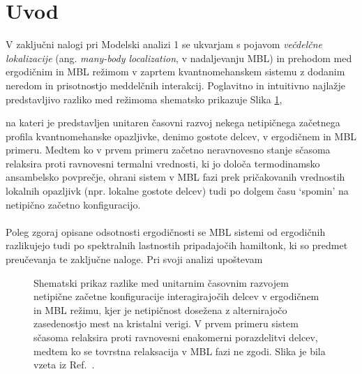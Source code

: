 \documentclass[10pt,a4paper]{article}
\begin{document}
\section{Uvod}
V zaključni nalogi pri Modelski analizi 1 se ukvarjam s pojavom \emph{večdelčne lokalizacije} (ang. \emph{many-body localization}, v nadaljevanju MBL) in prehodom med ergodičnim in MBL režimom v zaprtem kvantnomehanskem sistemu z dodanim neredom in prisotnostjo meddelčnih interakcij. Poglavitno in intuitivno najlažje predstavljivo razliko med režimoma shematsko prikazuje Slika \ref{fig:abanin_thermalization},
\noindent 
\begin{minipage}[t]{0.45\textwidth}
\noindent
na kateri je predstavljen unitaren časovni razvoj nekega netipičnega začetnega profila kvantnomehanske opazljivke, denimo gostote delcev, v ergodičnem in MBL primeru. Medtem ko v prvem primeru začetno neravnovesno stanje sčasoma relaksira proti ravnovesni termalni vrednosti, ki jo določa termodinamsko ansambelsko povprečje, ohrani sistem v MBL fazi prek pričakovanih vrednostih lokalnih opazljivk (npr. lokalne gostote delcev) tudi po dolgem času `spomin' na netipično začetno konfiguracijo. \\\\
Poleg zgoraj opisane odsotnosti ergodičnosti se MBL sistemi od ergodičnih razlikujejo tudi po spektralnih lastnostih pripadajočih hamiltonk, ki so predmet preučevanja te zaključne naloge. Pri svoji analizi upoštevam 	  
\end{minipage}\hfill
\begin{minipage}[t]{0.5\textwidth}
\begin{figure}[H]
\caption{Shematski prikaz razlike med unitarnim časovnim razvojem netipične začetne konfiguracije interagirajočih delcev v ergodičnem in MBL režimu, kjer je netipičnost dosežena z alternirajočo zasedenostjo mest na kristalni verigi.
 V prvem primeru sistem sčasoma relaksira proti ravnovesni enakomerni porazdelitvi delcev, medtem ko se tovrstna relaksacija v MBL fazi ne zgodi. Slika je bila vzeta iz Ref.~\cite{abanin2018ergodicity}. }
\label{fig:abanin_thermalization}
\end{figure}
\end{minipage}
\end{document}
